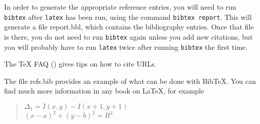 In order to generate the appropriate reference entries, you will need
to run \texttt{bibtex} after \texttt{latex} has been run, using the
command \texttt{bibtex report}. This will generate a file
\textsf{report.bbl}, which contains the bibliography entries. Once
that file is there, you do not need to run \texttt{bibtex} again
unless you add new citations, but you will probably have to run
\texttt{latex} twice after running \texttt{bibtex} the first time.

The \TeX{} FAQ (\cite{url-cite}) gives tips on how to cite URLs.

The file \textsf{refs.bib} provides an example of what can be done
with Bib\TeX. You can find much more information in any book on
\LaTeX, for example \cite{lamport,companion,kopka}



\begin{quote}
\centering
$\Delta_1=I(x,y)-I(x+1,y+1)$ \\
$(x-a)^2+(y-b)^2=R^2$
\end{quote}